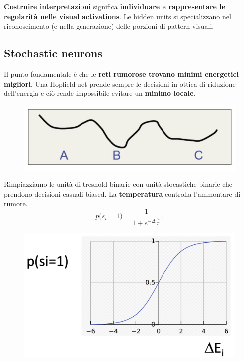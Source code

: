 \textbf{Costruire interpretazioni} significa \textbf{individuare e rappresentare le regolarità nelle visual activations}. Le hidden units si specializzano nel riconoscimento (e nella generazione) delle porzioni di pattern visuali.
\subsection{Stochastic neurons}
Il punto fondamentale è che le \textbf{reti rumorose trovano minimi energetici migliori}. Una Hopfield net prende sempre le decisioni in ottica di riduzione dell'energia e ciò rende impossibile evitare un \textbf{minimo locale}.
\begin{figure}[!h]
    \includegraphics[scale=.8]{images/rbm/local_minima.png}
    \centering
\end{figure}
\newpage
Rimpiazziamo le unità di treshold binarie con unità stocastiche binarie che prendono decisioni casuali biased. La \textbf{temperatura} controlla l'ammontare di rumore.
\begin{equation}
    p\big( s_i=1 \big) = \frac{1}{1+e^{-\Delta \frac{E_i}{T}}}.
\end{equation}
\begin{figure}[!h]
    \includegraphics[scale=.5]{images/rbm/temp.png}
    \centering
\end{figure}


